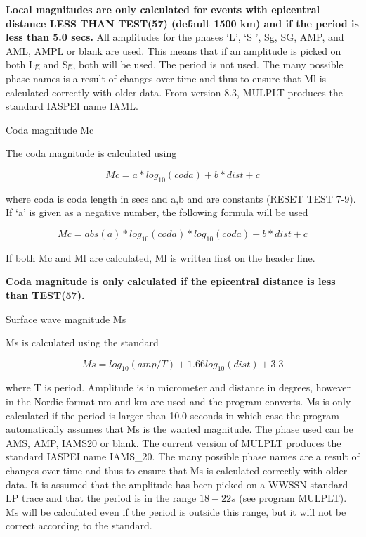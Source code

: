 \textbf{Local magnitudes are only calculated for events with 
epicentral distance LESS THAN TEST(57) (default 1500 km) and if 
the period is less than 5.0 secs.} All amplitudes for the phases 
`L', `S ', Sg, SG, AMP, and AML, AMPL or blank are used. 
This means that if an amplitude is picked on both Lg and Sg, both 
will be used. The period is not used. The many possible phase names 
is a result of changes over time and thus to ensure that Ml is 
calculated correctly with older data. From version 8.3,  MULPLT 
produces the standard IASPEI name IAML. 

Coda magnitude Mc

The coda magnitude is calculated using 

\begin{displaymath}
Mc = a * log_{10}(coda) + b * dist + c 
\end{displaymath}

where coda is coda length in secs and a,b and are constants (RESET 
TEST 7-9). If `a' is given as a negative number, the following formula will be used 

\begin{displaymath}
Mc = abs(a)*log_{10}(coda)*log_{10}(coda) + b * dist + c 
\end{displaymath}

If both Mc and Ml are calculated, Ml is written first on the header line. 

\textbf{Coda magnitude is only calculated if the epicentral distance is less than TEST(57).}

Surface wave magnitude Ms

Ms is calculated using the standard 

\begin{displaymath}
Ms = log_{10}(amp/T)+1.66log_{10}(dist)+3.3
\end{displaymath}

where T is period. Amplitude is in micrometer and distance in degrees, 
however in the Nordic format nm and km are used and the program 
converts. Ms is only calculated if the period is larger than 10.0 seconds 
in which case the program automatically assumes that Ms is the wanted 
magnitude. The phase used can be AMS, AMP, IAMS20 or blank. The current version 
of MULPLT produces the standard IASPEI name IAMS\_20.
The many possible phase names are a result of changes over time and 
thus to ensure that Ms is calculated correctly with older data. It 
is assumed that the amplitude has been picked on a WWSSN standard 
LP trace and that the period is in the range $18-22 s$ (see program 
MULPLT). Ms will be calculated even if the period is outside this 
range, but it will not be correct according to the standard.

